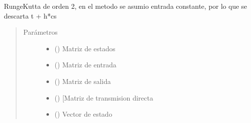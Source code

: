 \documentclass[letterpaper,10pt,spanish]{sphinxmanual}
\begin{document}
\begin{fulllineitems}
\label{\detokenize{codigos/rk_generator:rk_generator.runge_kutta2}}
Runge\sphinxhyphen{}Kutta de orden 2, en el metodo se asumio entrada constante, por lo que se descarta t + h*cs
\begin{quote}\begin{description}
\item[{Parámetros}] \leavevmode\begin{itemize}
\item {} 
 (\sphinxstyleliteralemphasis{\sphinxupquote{, }}\sphinxstyleliteralemphasis{\sphinxupquote{, }}) \textendash{} Matriz de estados

\item {} 
 (\sphinxstyleliteralemphasis{\sphinxupquote{, }}\sphinxstyleliteralemphasis{\sphinxupquote{, }}) \textendash{} Matriz de entrada

\item {} 
 (\sphinxstyleliteralemphasis{\sphinxupquote{, }}\sphinxstyleliteralemphasis{\sphinxupquote{, }}) \textendash{} Matriz de salida

\item {} 
 (\sphinxstyleliteralemphasis{\sphinxupquote{, }}\sphinxstyleliteralemphasis{\sphinxupquote{, }}) \textendash{} {[}Matriz de transmision directa

\item {} 
 (\sphinxstyleliteralemphasis{\sphinxupquote{, }}\sphinxstyleliteralemphasis{\sphinxupquote{, }}) \textendash{} Vector de estado


\end{itemize}
\end{description}
\end{quote}
\end{fulllineitems}
\end{document}
